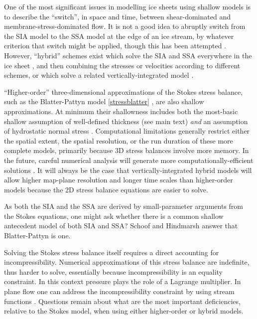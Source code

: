 \documentclass[letterpaper,final,12pt,reqno]{amsart}
\begin{document}
One of the most significant issues in modelling ice sheets using shallow models is to describe the ``switch'', in space and time, between shear-dominated and membrane-stress-dominated flow.  It is not a good idea to abruptly switch from the SIA model to the SSA model at the edge of an ice stream, by whatever criterion that switch might be applied, though this has been attempted \cite{HulbeMacAyeal,Ritzetal2001}.  However, ``hybrid'' schemes exist which solve the SIA and SSA everywhere in the ice sheet \cite{BBssasliding,Winkelmannetal2011}, and then combining the stresses or velocities according to different schemes, or which solve a related vertically-integrated model \cite{BrinkerhoffJohnson2013,Goldberg2011,PollardDeConto}.

``Higher-order'' three-dimensional approximations of the Stokes stress balance, such as the Blatter-Pattyn model \eqref{stressblatter} \cite{Blatter,Pattyn03}, are also shallow approximations.  At minimum their shallowness includes both the most-basic shallow assumption of well-defined thickness (see main text) \emph{and} an assumption of hydrostatic normal stress \cite{GreveBlatter2009}.  Computational limitations generally restrict either the spatial extent, the spatial resolution, or the run duration of these more complete models, primarily because 3D stress balances involve more memory.  In the future, careful numerical analysis will generate more computationally-efficient solutions \cite{Brown2013}.  It will always be the case that vertically-integrated hybrid models will allow higher map-plane resolution and longer time scales than higher-order models because the 2D stress balance equations are easier to solve.

As both the SIA and the SSA are derived by small-parameter arguments from the Stokes equations, one might ask whether there is a common shallow antecedent model of both SIA and SSA?  Schoof and Hindmarsh \cite{SchoofHindmarsh} answer that Blatter-Pattyn is one.

Solving the Stokes stress balance itself \cite{JouvetRappaz2011,Lengetal2012,ISMIPHOM} requires a direct accounting for incompressibility.  Numerical approximations of this stress balance are indefinite, thus harder to solve, essentially because incompressibility is an equality constraint.  In this context pressure plays the role of a Lagrange multiplier.  In plane flow one can address the incompressibility constraint by using stream functions \cite{BaliseRaymond1985}.  Questions remain about what are the most important deficiencies, relative to the Stokes model, when using either higher-order \cite{ISMIPHOM} or hybrid models.
\end{document}
